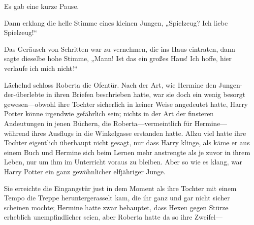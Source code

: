 Es gab eine kurze Pause.

Dann erklang die helle Stimme eines kleinen Jungen,
„Spielzeug? Ich liebe Spielzeug!“

Das Geräusch von Schritten war zu vernehmen, die ins Haus eintraten, dann sagte dieselbe hohe Stimme,
„Mann! Ist das ein großes Haus! Ich hoffe, hier verlaufe ich mich nicht!“

Lächelnd schloss Roberta die Ofentür. Nach der Art, wie Hermine den Jungen-der-überlebte in ihren Briefen beschrieben hatte, war sie doch ein wenig besorgt gewesen—obwohl ihre Tochter sicherlich in keiner Weise angedeutet hatte, Harry Potter könne irgendwie gefährlich sein; nichts in der Art der finsteren Andeutungen in jenen Büchern, die Roberta—vermeintlich für Hermine—während ihres Ausflugs in die Winkelgasse erstanden hatte. Allzu viel hatte ihre Tochter eigentlich überhaupt nicht gesagt, nur dass Harry klinge, als käme er aus einem Buch und Hermine sich beim Lernen mehr anstrengte als je zuvor in ihrem Leben, nur um ihm im Unterricht voraus zu bleiben. Aber so wie es klang, war Harry Potter ein ganz gewöhnlicher elfjähriger Junge.

Sie erreichte die Eingangstür just in dem Moment als ihre Tochter mit einem Tempo die Treppe heruntergerasselt kam, die ihr ganz und gar nicht sicher scheinen mochte; Hermine hatte zwar behauptet, dass Hexen gegen Stürze erheblich unempfindlicher seien, aber Roberta hatte da so ihre Zweifel—

